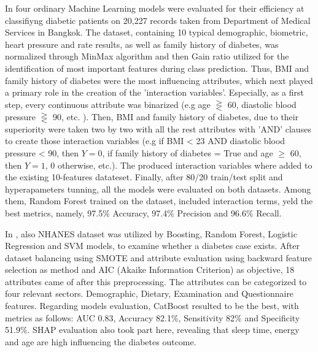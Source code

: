 \documentclass[journal,article,submit,pdftex,moreauthors]{Definitions/mdpi}
\begin{document}
\par In \cite{computation11050096} four ordinary Machine Learning models were evaluated for their efficiency at classifiyng diabetic
patients on 20,227 records taken from Department of Medical Services in Bangkok. The dataset, containing 10 typical demographic,
biometric, heart pressure and rate results, as well as family history of diabetes, was normalized through MinMax algorithm and then
Gain ratio utilized for the identification of most important features during class prediction. Thus, BMI and family history of diabetes
were the most influencing attributes, which next played a primary role in the creation of the 'interaction variables'. Especially, as
a first step, every continuous attribute was binarized (e.g age $\gtreqless$ 60, diastolic blood pressure $\gtreqless$ 90, etc. ).
Then, BMI and family history of diabetes, due to their superiority were taken two by two with all the rest attributes with 'AND' clauses
to create those interaction variables (e.g if BMI < 23 AND  diastolic blood pressure < 90, then $Y = 0$, if family history of diabetes
= True and age $\geq$ 60, then $Y=1$, 0 otherwise, etc.). The produced interaction variables where added to  the existing 10-features
datateset. Finally, after 80/20 train/test split and hyperapameters tunning, all the models were evaluated on both datasets. Among
them, Random Forest trained on the dataset, included interaction terms, yeld the best metrics, namely, 97.5\% Accuracy, 97.4\% Precision
and 96.6\% Recall.

\par In \cite{Qin}, also NHANES dataset was utilized by Boosting, Random Forest, Logistic Regression and SVM models, to examine whether
a diabetes case exists. After dataset balancing using SMOTE and attribute evaluation using backward feature selection as method
and AIC (Akaike Information Criterion) as objective, 18 attributes came of after this preprocessing. The attributes can be categorized
to four relevant sectors. Demographic, Dietary, Examination and Questionnaire features. Regarding models evaluation, CatBoost
resulted to be the best, with metrics as follows: AUC 0.83, Accuracy 82.1\%, Sensitivity 82\% and Specificity 51.9\%. SHAP evaluation
also took part here, revealing that sleep time, energy and age are high influencing the diabetes outcome.
\end{document}
